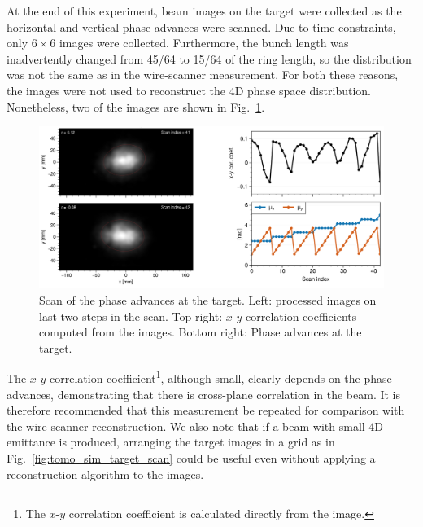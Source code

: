 At the end of this experiment, beam images on the target were collected as the horizontal and vertical phase advances were scanned. Due to time constraints, only $6 \times 6$ images were collected. Furthermore, the bunch length was inadvertently changed from 45/64 to 15/64 of the ring length, so the distribution was not the same as in the wire-scanner measurement. For both these reasons, the images were not used to reconstruct the 4D phase space distribution. Nonetheless, two of the images are shown in Fig.~\ref{fig:exp3_target_scan}. 
%
\begin{figure}[!p]
    \centering
    \includegraphics[width=\textwidth]{Images/chapter5/exp3/target_scan/target_scan.png}
    \caption{Scan of the phase advances at the target. Left: processed images on last two steps in the scan. Top right: $x$-$y$ correlation coefficients computed from the images. Bottom right: Phase advances at the target.}
    \label{fig:exp3_target_scan}
\end{figure}
%
The $x$-$y$ correlation coefficient\footnote{The $x$-$y$ correlation coefficient is calculated directly from the image.}, although small, clearly depends on the phase advances, demonstrating that there is cross-plane correlation in the beam. It is therefore recommended that this measurement be repeated for comparison with the wire-scanner reconstruction. We also note that if a beam with small 4D emittance is produced, arranging the target images in a grid as in Fig.~\ref{fig:tomo_sim_target_scan} could be useful even without applying a reconstruction algorithm to the images. 

